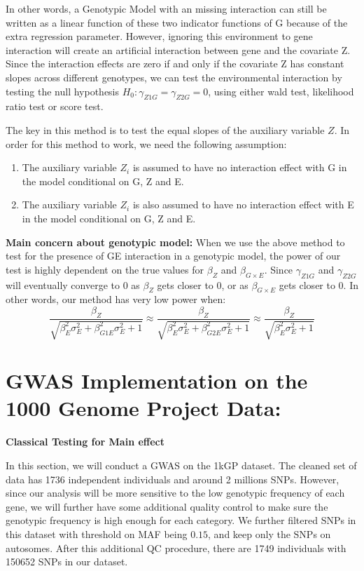 \documentclass[
]{article}
\begin{document}
In other words, a Genotypic Model with an missing interaction can still
be written as a linear function of these two indicator functions of G
because of the extra regression parameter. However, ignoring this
environment to gene interaction will create an artificial interaction
between gene and the covariate Z. Since the interaction effects are zero
if and only if the covariate Z has constant slopes across different
genotypes, we can test the environmental interaction by testing the null
hypothesis \(H_0: \gamma_{Z1G} = \gamma_{Z2G} = 0\), using either wald
test, likelihood ratio test or score test.

The key in this method is to test the equal slopes of the auxiliary
variable \(Z\). In order for this method to work, we need the following
assumption:

\begin{enumerate}
\item The auxiliary variable $Z_i$ is assumed to have no interaction effect with G in the model conditional on G, Z and E.
\item The auxiliary variable $Z_i$ is also assumed to have no interaction effect with E in the model conditional on G, Z and E.
\end{enumerate}

\textbf{Main concern about genotypic model:} When we use the above
method to test for the presence of GE interaction in a genotypic model,
the power of our test is highly dependent on the true values for
\(\beta_Z\) and \(\beta_{G\times E}\). Since \(\gamma_{Z1G}\) and
\(\gamma_{Z2G}\) will eventually converge to \(0\) as \(\beta_Z\) gets
closer to \(0\), or as \(\beta_{G\times E}\) gets closer to \(0\). In
other words, our method has very low power when:
\[\frac{\beta_Z}{\sqrt{\beta_E^2\sigma_E^2+\beta_{G1E}^2\sigma_E^2 +1}} \approx \frac{\beta_Z}{\sqrt{\beta_E^2\sigma_E^2+\beta_{G2E}^2\sigma_E^2 +1}} \approx \frac{\beta_Z}{\sqrt{\beta_E^2\sigma_E^2+1}}\]

\hypertarget{gwas-implementation-on-the-1000-genome-project-data}{%
\section{GWAS Implementation on the 1000 Genome Project
Data:}\label{gwas-implementation-on-the-1000-genome-project-data}}

\textbf{Classical Testing for Main effect}

In this section, we will conduct a GWAS on the 1kGP dataset. The cleaned
set of data has 1736 independent individuals and around 2 millions SNPs.
However, since our analysis will be more sensitive to the low genotypic
frequency of each gene, we will further have some additional quality
control to make sure the genotypic frequency is high enough for each
category. We further filtered SNPs in this dataset with threshold on MAF
being \(0.15\), and keep only the SNPs on autosomes. After this
additional QC procedure, there are 1749 individuals with 150652 SNPs in
our dataset.
\end{document}
